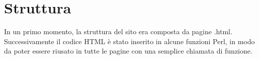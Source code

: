 \documentclass[../Relazione.tex]{subfiles}
\begin{document}
\section{Struttura}

In un primo momento, la struttura del sito era composta da pagine .html. Successivamente il codice HTML è stato inserito in alcune funzioni Perl, in modo da poter essere riusato in tutte le pagine con una semplice chiamata di funzione.
			
\end{document}
